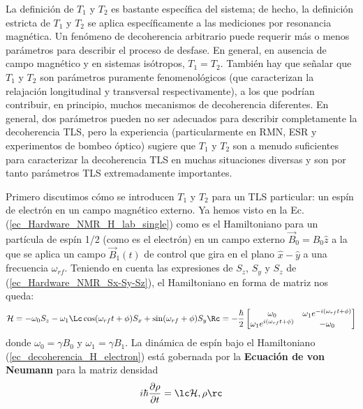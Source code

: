     La definición de $T_1$ y $T_2$ es bastante específica del sistema; de hecho, la definición estricta de $T_1$ y $T_2$ se aplica específicamente a las mediciones por resonancia magnética. Un fenómeno de decoherencia arbitrario puede requerir más o menos parámetros para describir el proceso de desfase. En general, en ausencia de campo magnético y en sistemas isótropos, $T_1 = T_2$. También hay que señalar que $T_1$ y $T_2$ son parámetros puramente fenomenológicos (que caracterizan la relajación longitudinal y transversal respectivamente), a los que podrían contribuir, en principio, muchos mecanismos de decoherencia diferentes. En general, dos parámetros pueden no ser adecuados para describir completamente la decoherencia TLS, pero la experiencia (particularmente en RMN, ESR y experimentos de bombeo óptico) sugiere que $T_1$ y $T_2$ son a menudo suficientes para caracterizar la decoherencia TLS en muchas situaciones diversas y son por tanto parámetros TLS extremadamente importantes.
    
    Primero discutimos cómo se introducen $T_1$ y $T_2$ para un TLS particular: un espín de electrón en un campo magnético externo. Ya hemos visto en la Ec. (\ref{ec_Hardware_NMR_H_lab_single}) como es el Hamiltoniano para un partícula de espín 1/2 (como es el electrón) en un campo externo $\vec{B}_0 = B_0 \hat{z}$ a la que se aplica un campo $\vec{B}_1(t)$ de control que gira en el plano $\hat{x}- \hat{y}$ a una frecuencia $\omega_{rf}$. Teniendo en cuenta las expresiones de $S_z$, $S_y$ y $S_z$ de (\ref{ec_Hardware_NMR_Sx-Sy-Sz}), el Hamiltoniano en forma de matriz nos queda:
    \begin{equation} \label{ec_decoherencia_H_electron}
        \mathcal{H} = - \omega_0 S_z - \omega_1 \Lc \cos (\omega_{rf} t+ \phi) S_x + \sin (\omega_{rf} + \phi) S_y \Rc 
        = - \frac{\hbar}{2} \begin{bmatrix}
        \omega_0                               &  \omega_1 e^{-i (\omega_{rf} t + \phi)} \\
        \omega_1 e^{i (\omega_{rf} t + \phi)}  &  -\omega_0 
        \end{bmatrix}
    \end{equation}
    donde $\omega_0 = \gamma B_0$ y $\omega_1 = \gamma B_1$. La dinámica de espín bajo el Hamiltoniano (\ref{ec_decoherencia_H_electron}) está gobernada por la \textbf{Ecuación de von Neumann} para la matriz densidad
    \begin{equation}
        i \hbar \frac{\partial \rho}{\partial t} = \lc \mathcal{H}, \rho \rc
    \end{equation}
    
